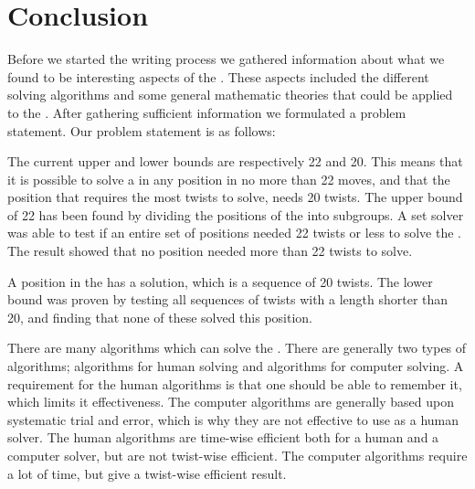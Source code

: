 \chapter{Conclusion}

Before we started the writing process we gathered information about what we found to be interesting aspects of the \rubik{}. 
These aspects included the different solving algorithms and some general mathematic theories that could be applied to the \rubik{}.
After gathering sufficient information we formulated a problem statement. Our problem statement is as follows:


\linebreak

The current upper and lower bounds are respectively 22 and 20. 
This means that it is possible to solve a \rubik{} in any position in no more than 22 moves, and that the \rubik{} position that requires the most twists to solve, needs 20 twists.
The upper bound of 22 has been found by dividing the positions of the \rubik{} into subgroups. A set solver was able to test if an entire set of positions needed 22 twists or less to solve the \rubik{}. The result showed that no \rubik{} position needed more than 22 twists to solve.

A position in the \rubik{} has a solution, which is a sequence of 20 twists. The lower bound was proven by testing all sequences of twists with a length shorter than 20, and finding that none of these solved this position.

There are many algorithms which can solve the \rubik{}. 
There are generally two types of algorithms; algorithms for human solving and algorithms for computer solving. 
A requirement for the human algorithms is that one should be able to remember it, which limits it effectiveness. 
The computer algorithms are generally based upon systematic trial and error, which is why they are not effective to use as a human solver.
The human algorithms are time-wise efficient both for a human and a computer solver, but are not twist-wise efficient.
The computer algorithms require a lot of time, but give a twist-wise efficient result.








